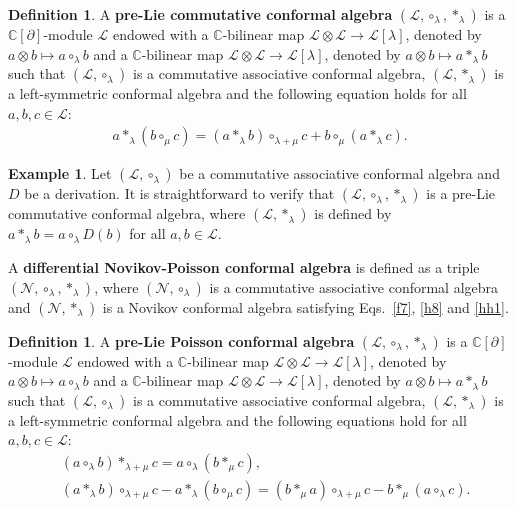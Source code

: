 \documentclass[11pt,letterpaper,reqno]{amsart}
\theoremstyle{definition}
\newtheorem{definition}[theorem]{Definition}
\newtheorem{example}[theorem]{Example}
\numberwithin{equation}{section}
\begin{document}
\begin{definition}
   A {\bf pre-Lie commutative conformal algebra} $(\mathcal{L} ,\circ_\lambda,\ast_\lambda)$ is a $\mathbb{C}[\partial]$-module $\mathcal{L}$ endowed with a $\mathbb{C}$-bilinear map $\mathcal{L}  \otimes \mathcal{L}  \rightarrow \mathcal{L} [\lambda]$, denoted by $a\otimes b\mapsto a \circ_{\lambda}b$ and a $\mathbb{C}$-bilinear map $\mathcal{L}  \otimes \mathcal{L}  \rightarrow \mathcal{L} [\lambda]$,
   denoted by $a\otimes b\mapsto a \ast_\lambda b$ such that $(\mathcal{L} ,\circ_\lambda)$ is a {commutative associative conformal algebra}, $(\mathcal{L} ,\ast_\lambda)$ is a {left-symmetric conformal algebra} and the following equation holds for all $a,b,c \in \mathcal{L}$:
   \begin{align}\label{hh1}
      a\ast_\lambda(b\circ_\mu c)=(a\ast_\lambda b)\circ_{\lambda+\mu}c+b\circ_\mu (a\ast_\lambda c).
   \end{align}
\end{definition}

\begin{example}
   Let $(\mathcal{L} ,\circ_\lambda)$ be a commutative associative conformal algebra and $D$ be a derivation.
   It is straightforward to verify that $(\mathcal{L} ,\circ_\lambda,\ast_\lambda)$ is a pre-Lie commutative conformal algebra,
   where $(\mathcal{L} ,\ast_\lambda)$ is defined by $a\ast_\lambda b=a\circ_\lambda D(b)$ for all $a,b \in \mathcal{L}$.
\end{example}

A {\bf differential Novikov-Poisson conformal algebra} is defined as a triple $(\mathcal{N} ,\circ_\lambda,\ast_\lambda)$, where
$(\mathcal{N} ,\circ_\lambda)$ is a {commutative associative conformal algebra} and $(\mathcal{N} ,\ast_\lambda)$ is a {Novikov conformal algebra}
satisfying Eqs.~\eqref{f7}, \eqref{h8} and \eqref{hh1}.

\begin{definition}
   A {\textbf{pre-Lie Poisson conformal algebra}} $(\mathcal{L} ,\circ_\lambda,\ast_\lambda)$ is a $\mathbb{C}[\partial]$-module $\mathcal{L} $ endowed with a $\mathbb{C}$-bilinear map $\mathcal{L}  \otimes \mathcal{L}  \rightarrow \mathcal{L} [\lambda]$, denoted by $a\otimes b\mapsto a \circ_{\lambda}b$ and a $\mathbb{C}$-bilinear map $\mathcal{L}  \otimes \mathcal{L}  \rightarrow \mathcal{L} [\lambda]$,
   denoted by $a\otimes b\mapsto a \ast_\lambda b$ such that $(\mathcal{L} ,\circ_\lambda)$ is a {commutative associative conformal algebra}, $(\mathcal{L} ,\ast_\lambda)$ is a {left-symmetric conformal algebra} and the following equations hold for all $a,b,c \in \mathcal{L}$:
   \begin{align}
      &(a\circ_\lambda b)\ast_{\lambda+\mu}c=a\circ_\lambda(b\ast_\mu c),\\
      &(a\ast_\lambda b)\circ_{\lambda+\mu}c-a\ast_\lambda(b\circ_\mu c)=(b\ast_\mu a)\circ_{\lambda+\mu}c-b\ast_\mu(a\circ_\lambda c).
   \end{align}
\end{definition}
\end{document}
